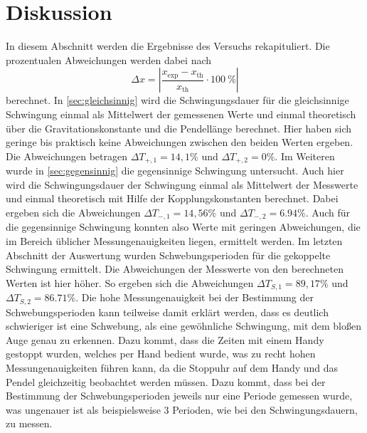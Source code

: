 \section{Diskussion}
\label{sec:Diskussion}
In diesem Abschnitt werden die Ergebnisse des Versuchs rekapituliert. Die prozentualen Abweichungen werden dabei nach 
\begin{equation*}
  \Delta x= | \frac{x_\text{exp} - x_\text{th}}{x_\text{th}} \cdot \SI{100}{\percent}|
\end{equation*}
berechnet. \newline
In \autoref{sec:gleichsinnig} wird die Schwingungsdauer für die gleichsinnige Schwingung einmal als Mittelwert der gemessenen Werte und einmal theoretisch über die Gravitationskonstante und die Pendellänge berechnet. Hier haben sich geringe bis praktisch keine Abweichungen zwischen den beiden Werten ergeben. Die Abweichungen betragen $\Delta T_{+,1}=14,1\%$ und $\Delta T_{+,2}=0\%$. \newline
Im Weiteren wurde in \autoref{sec:gegensinnig} die gegensinnige Schwingung untersucht. Auch hier wird die Schwingungsdauer der Schwingung einmal als Mittelwert der Messwerte und einmal theoretisch mit Hilfe der Kopplungskonstanten berechnet.
Dabei ergeben sich die Abweichungen $\Delta T_{-,1}=14,56\%$ und $\Delta T_{-,2}=6.94\%$. Auch für die gegensinnige Schwingung konnten also Werte mit geringen Abweichungen, die im Bereich üblicher Messungenauigkeiten liegen, ermittelt werden. \newline
Im letzten Abschnitt der Auswertung wurden Schwebungsperioden für die gekoppelte Schwingung ermittelt. Die Abweichungen der Messwerte von den berechneten Werten ist hier höher. So ergeben sich die Abweichungen $\Delta T_{S,1}=89,17\%$ und $\Delta T_{S,2}=86.71\%$. Die hohe Messungenauigkeit bei der Bestimmung der Schwebungsperioden kann teilweise damit erklärt werden, dass es deutlich schwieriger ist eine Schwebung, als eine gewöhnliche Schwingung, mit dem bloßen Auge genau zu erkennen. Dazu kommt, dass die Zeiten mit einem Handy gestoppt wurden, welches per Hand bedient wurde, was zu recht hohen Messungenauigkeiten führen kann, da die Stoppuhr auf dem Handy und das Pendel gleichzeitig beobachtet werden müssen. Dazu kommt, dass bei der Bestimmung der Schwebungsperioden jeweils nur eine Periode gemessen wurde, was ungenauer ist als beispielsweise 3 Perioden, wie bei den Schwingungsdauern, zu messen. 